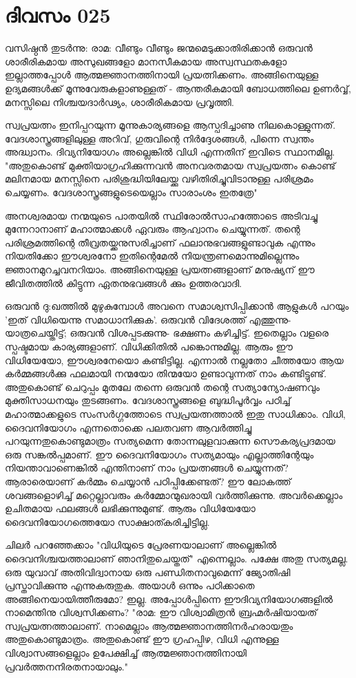  
\section{ദിവസം 025}


വസിഷ്ഠന്‍ തുടര്‍ന്നു: രാമ: വീണ്ടും വീണ്ടും ജന്മമെടുക്കാതിരിക്കാന്‍ ഒരുവന്‍ ശാരീരികമായ അസുഖങ്ങളോ മാനസീകമായ അസ്വസ്ഥതകളോ ഇല്ലാത്തപ്പോള്‍ ആത്മജ്ഞാനത്തിനായി പ്രയത്നിക്കണം. അങ്ങിനെയുള്ള ഉദ്യമങ്ങള്‍ക്ക്‌ മൂന്നുവേരുകളാണുള്ളത്‌ - ആന്തരീകമായി ബോധത്തിലെ ഉണര്‍വ്വ്‌, മനസ്സിലെ നിശ്ചയദാര്‍ഢ്യം, ശാരീരികമായ പ്രവൃത്തി.

സ്വപ്രയത്നം ഇനിപ്പറയുന്ന മൂന്നുകാര്യങ്ങളെ ആസ്പദിച്ചാണു നിലകൊള്ളുന്നത്‌. വേദശാസ്ത്രങ്ങളിലുള്ള അറിവ്‌, ഗുരുവിന്റെ നിര്‍ദ്ദേശങ്ങള്‍, പിന്നെ സ്വന്തം അദ്ധ്വാനം. ദിവ്യനിയോഗം അല്ലെങ്കില്‍ വിധി എന്നതിന്‌ ഇവിടെ സ്ഥാനമില്ല. "അതുകൊണ്ട്‌ മുക്തിയാഗ്രഹിക്കുന്നവന്‍ അനവരതമായ സ്വപ്രയത്നം കൊണ്ട്‌ മലിനമായ മനസ്സിനെ പരിശുദ്ധിയിലേയ്ക്കു വഴിതിരിച്ചുവിടാനുള്ള പരിശ്രമം ചെയ്യണം. വേദശാസ്ത്രങ്ങളുടെയെല്ലാം സാരാംശം ഇതത്രേ" 

അനശ്വരമായ നന്മയുടെ പാതയില്‍ സ്ഥിരോല്‍സാഹത്തോടെ അടിവച്ചു മുന്നേറാനാണ്‌ മഹാത്മാക്കള്‍ ഏവരും ആഹ്വാനം ചെയ്യുന്നത്‌. തന്റെ പരിശ്രമത്തിന്റെ തീവ്രതയ്ക്കനുസരിച്ചാണ്‌ ഫലാനുഭവങ്ങളുണ്ടാവുക എന്നും നിയതിക്കോ ഈശ്വരനോ ഇതിന്റെമേല്‍ നിയന്ത്രണമൊന്നുമില്ലെന്നും ജ്ഞാനമുറച്ചവനറിയാം. അങ്ങിനെയുള്ള പ്രയത്നങ്ങളാണ്‌ മനുഷ്യന്‌ ഈ ജീവിതത്തില്‍ കിട്ടുന്ന ഏതനുഭവങ്ങള്‍ ക്കും ഉത്തരവാദി.

ഒരുവന്‍ ദു:ഖത്തില്‍ മുഴുകുമ്പോള്‍ അവനെ സമാശ്വസിപ്പിക്കാന്‍ ആളുകള്‍ പറയും 'ഇത്‌ വിധിയെന്നു സമാധാനിക്കുക'. ഒരുവന്‍ വിദേശത്ത്‌ എത്തുന്നു- യാത്രചെയ്തിട്ട്‌; ഒരുവന്‍ വിശപ്പടക്കുന്നു- ഭക്ഷണം കഴിച്ചിട്ട്‌. ഇതെല്ലാം വളരെ സ്പഷ്ടമായ കാര്യങ്ങളാണ്‌. വിധിക്കിതില്‍ പങ്കൊന്നുമില്ല. ആരും ഈ വിധിയേയോ, ഈശ്വരനേയൊ കണ്ടിട്ടില്ല. എന്നാല്‍ നല്ലതോ ചീത്തയോ ആയ കര്‍മ്മങ്ങള്‍ക്കു ഫലമായി നന്മയോ തിന്മയോ ഉണ്ടാവുന്നത്‌ നാം കണ്ടിട്ടുണ്ട്‌. അതുകൊണ്ട്‌ ചെറുപ്പം മുതലേ തന്നെ ഒരുവന്‍ തന്റെ സത്യാന്യോഷണവും മുക്തിസാധനയും തുടങ്ങണം. വേദശാസ്ത്രങ്ങളെ ബുദ്ധിപൂര്‍വ്വം പഠിച്ച്‌ മഹാത്മാക്കളുടെ സംസര്‍ഗ്ഗത്തോടെ സ്വപ്രയത്നത്താല്‍ ഇതു സാധിക്കാം. വിധി, ദൈവനിയോഗം എന്നതൊക്കെ പലതവണ ആവര്‍ത്തിച്ചു പറയുന്നതുകൊണ്ടുമാത്രം സത്യമെന്ന തോന്നലുളവാക്കുന്ന സൌകര്യപ്രദമായ ഒരു സങ്കല്‍പ്പമാണ്‌. ഈ ദൈവനിയോഗം സത്യമായും എല്ലാത്തിന്റേയും നിയന്താവാണെങ്കില്‍ എന്തിനാണ്‌ നാം പ്രയത്നങ്ങള്‍ ചെയ്യുന്നത്‌? ആരാരെയാണ്‌ കര്‍മ്മം ചെയ്യാന്‍ പഠിപ്പിക്കേണ്ടത്‌? ഈ ലോകത്ത്‌ ശവങ്ങളൊഴിച്ച്‌  മറ്റെല്ലാവരും കര്‍മ്മോന്മുഖരായി വര്‍ത്തിക്കുന്നു. അവര്‍ക്കെല്ലാം ഉചിതമായ ഫലങ്ങള്‍ ലഭിക്കുന്നുമുണ്ട്‌. ആരും വിധിയേയോ ദൈവനിയോഗത്തെയോ സാക്ഷാത്കരിച്ചിട്ടില്ല.

ചിലര്‍ പറഞ്ഞേക്കാം "വിധിയുടെ പ്രേരണയാലാണ്‌ അല്ലെങ്കില്‍ ദൈവനിശ്ചയത്താലാണ്‌ ഞാനിതുചെയ്തത്‌" എന്നെല്ലാം. പക്ഷേ അതു സത്യമല്ല. ഒരു യുവാവ്‌ അതിവിദ്വാനായ ഒരു പണ്ഡിതനാവുമെന്ന് ജ്യോതിഷി പ്രസ്താവിക്കുന്നു എന്നുകരുതുക. അയാള്‍ ഒന്നും പഠിക്കാതെ അങ്ങിനെയായിത്തീരുമോ? ഇല്ല. അപ്പോള്‍പ്പിന്നെ ഈദിവ്യനിയോഗങ്ങളില്‍ നാമെന്തിനു വിശ്വസിക്കണം? "രാമ: ഈ വിശ്വാമിത്രന്‍ ബ്രഹ്മര്‍ഷിയായത്‌ സ്വപ്രയത്നത്താലാണ്‌. നാമെല്ലാം ആത്മജ്ഞാനത്തിനര്‍ഹരായതും അതുകൊണ്ടുമാത്രം. അതുകൊണ്ട്‌ ഈ ഗ്രഹപ്പിഴ, വിധി എന്നുള്ള വിശ്വാസങ്ങളെല്ലാം ഉപേക്ഷിച്ച്‌ ആത്മജ്ഞാനത്തിനായി പ്രവര്‍ത്തനനിരതനായാലും."
